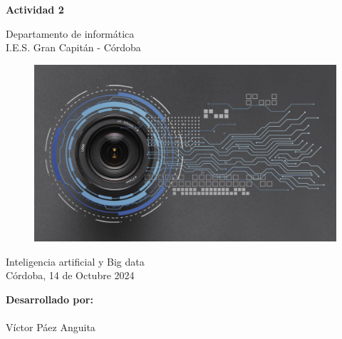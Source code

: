 \documentclass[12pt]{article}
\begin{document}
\begin{titlepage}
    \begin{center}
      \Large \bfseries{}
    \end{center}
    \vspace{0.1cm}
    \begin{center}
      \Large \bfseries{}
    \end{center}
    \vspace{0.1cm}
    \begin{center}
     \Large \bfseries{Actividad 2}
    \end{center}
    \vspace{0.0001cm}
    \begin{center}
        Departamento de informática \\ I.E.S. Gran Capitán - Córdoba
    \end{center}
        \vspace{2 cm}
\begin{figure}[h!]
    \centering
    \includegraphics[width=.8\textwidth]{visión-artificial.jpg}
    \label{fig:my_label}
\end{figure}
    \vspace{0.2 cm}
    \begin{center}
        Inteligencia artificial y Big data \\ Córdoba, 14 de Octubre 2024
    \end{center}
    \vspace{4 cm}
\null\hfill \textbf{Desarrollado por:}
\\
\\
\null\hfill Víctor Páez Anguita
\clearpage
\end{titlepage}

\tableofcontents
\clearpage
\end{document}
